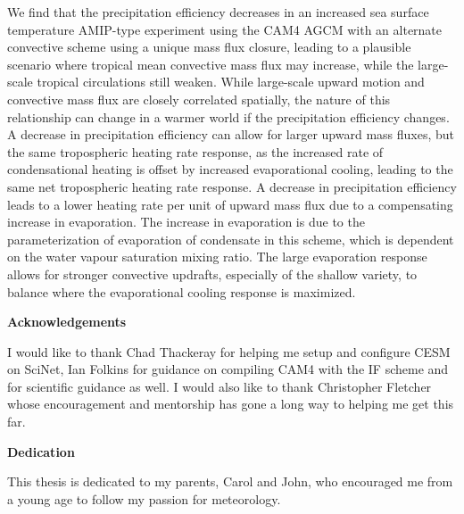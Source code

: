 We find that the precipitation efficiency decreases in an increased sea surface temperature AMIP-type experiment using the CAM4 AGCM with an alternate convective scheme using a unique mass flux closure, leading to a plausible scenario where tropical mean convective mass flux may increase, while the large-scale tropical circulations still weaken. While large-scale upward motion and convective mass flux are closely correlated spatially, the nature of this relationship can change in a warmer world if the precipitation efficiency changes. A decrease in precipitation efficiency can allow for larger upward mass fluxes, but the same tropospheric heating rate response, as the increased rate of condensational heating is offset by increased evaporational cooling, leading to the same net tropospheric heating rate response. A decrease in precipitation efficiency leads to a lower heating rate per unit of upward mass flux due to a compensating increase in evaporation. The increase in evaporation is due to the parameterization of evaporation of condensate in this scheme, which is dependent on the water vapour saturation mixing ratio. The large evaporation response allows for stronger convective updrafts, especially of the shallow variety, to balance where the evaporational cooling response is maximized. 
\cleardoublepage


\begin{center}\textbf{Acknowledgements}\end{center}

I would like to thank Chad Thackeray for helping me setup and configure CESM on SciNet, Ian Folkins for guidance on compiling CAM4 with the IF scheme and for scientific guidance as well. I would also like to thank Christopher Fletcher whose encouragement and mentorship has gone a long way to helping me get this far.
\cleardoublepage


\begin{center}\textbf{Dedication}\end{center}
This thesis is dedicated to my parents, Carol and John, who encouraged me from a young age to follow my passion for meteorology.
\cleardoublepage

\renewcommand\contentsname{Table of Contents}
\tableofcontents
\cleardoublepage
{}    %

